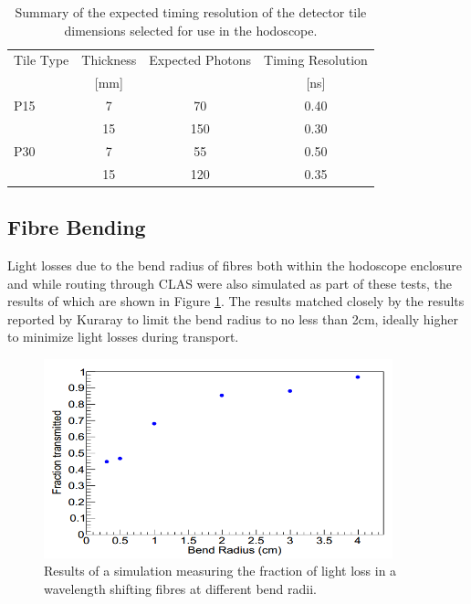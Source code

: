 \begin{table}\centering
	\renewcommand{\arraystretch}{1.3}
	\begin{tabular}{ @{}l  c  c  c@{}} 
		\toprule
		Tile Type & Thickness & Expected Photons & Timing Resolution \\
		& {\small [mm]}& & {\small [ns]}\\
		\midrule
		P15 & 7 & 70 & 0.40\\
		& 15 & 150 & 0.30\\
		\midrule
		P30 & 7 & 55 & 0.50\\
		& 15 & 120 & 0.35\\
		\bottomrule
	\end{tabular}
	\caption{Summary of the expected timing resolution of the detector tile dimensions selected for use in the hodoscope.}
	\label{SimulationTileTimingSummary}
\end{table}

\subsection{Fibre Bending}

Light losses due to the bend radius of fibres both within the hodoscope enclosure and while routing through CLAS were also simulated as part of these tests, the results of which are shown in Figure \ref{SimulationBendRadius}. The results matched closely by the results reported by Kuraray to limit the bend radius to no less than 2cm, ideally higher to minimize light losses during transport. 

\begin{figure}
	\centering
	\includegraphics[width=0.9\textwidth]{ImgChap1/bendsim}
	\caption{Results of a simulation measuring the fraction of light loss in a wavelength shifting fibres at different bend radii. \cite{FTTDR2012}}
	\label{SimulationBendRadius}
\end{figure}

